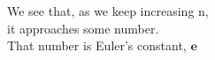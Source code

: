\documentclass[preview]{standalone}
\begin{document}
\begin{center}
We see that, as we keep increasing n, \\ it approaches some number. \\ That number is Euler's constant, $\mathbf{e}$
\end{center}
\end{document}
